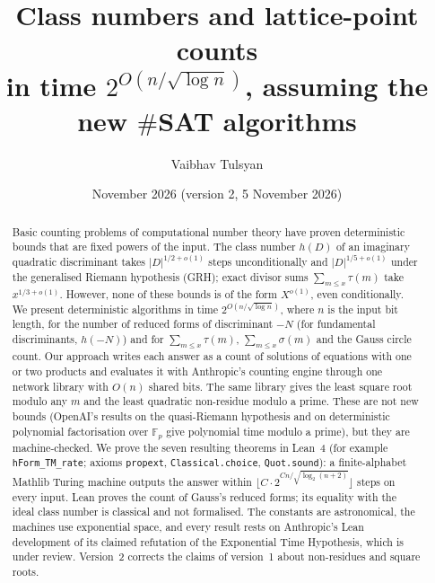 \documentclass[10pt]{amsart}
\theoremstyle{plain}
\theoremstyle{definition}
\theoremstyle{remark}
\numberwithin{equation}{section}
\begin{document}
\title[Class numbers and lattice-point counts in $2^{O(n/\sqrt{\log n})}$]{Class numbers and lattice-point counts\\ in time $2^{O(n/\sqrt{\log n})}$, assuming the new $\#$SAT algorithms}

\author{Vaibhav Tulsyan}

\date{November 2026 (version 2, 5 November 2026)}


\begin{abstract}
Basic counting problems of computational number theory have proven deterministic bounds that are fixed
powers of the input. The class number $h(D)$ of an imaginary quadratic discriminant takes $|D|^{1/2+o(1)}$
steps unconditionally and $|D|^{1/5+o(1)}$ under the generalised Riemann hypothesis (GRH); exact divisor
sums $\sum_{m\le x}\tau(m)$ take $x^{1/3+o(1)}$. However, none of these bounds is of the form $X^{o(1)}$,
even conditionally. We present deterministic algorithms in time $2^{O(n/\sqrt{\log n})}$, where $n$ is the
input bit length, for the number of reduced forms of discriminant $-N$ (for fundamental discriminants,
$h(-N)$) and for $\sum_{m\le x}\tau(m)$, $\sum_{m\le x}\sigma(m)$ and the Gauss circle count. Our approach
writes each answer as a count of solutions of equations with one or two products and evaluates it with
Anthropic's counting engine through one network library with $O(n)$ shared bits. The same library gives
the least square root modulo any $m$ and the least quadratic non-residue modulo a prime. These are not new
bounds (OpenAI's results on the quasi-Riemann hypothesis and on deterministic polynomial factorisation
over $\mathbb{F}_p$ give polynomial time modulo a prime), but they are machine-checked. We prove the seven
resulting theorems in Lean~4 (for example
\texttt{hForm\_TM\_rate}; axioms \texttt{propext}, \texttt{Classical.choice}, \texttt{Quot.sound}): a
finite-alphabet Mathlib Turing machine outputs the answer within
$\lfloor C\cdot2^{Cn/\sqrt{\log_2(n+2)}}\rfloor$ steps on every input. Lean proves the count of Gauss's
reduced forms; its equality with the ideal class number is classical and not formalised. The constants
are astronomical, the machines use exponential space, and every result rests on Anthropic's Lean development of its claimed refutation of the Exponential Time Hypothesis, which is under review.
Version~2 corrects the claims of version~1 about non-residues and square roots.
\end{abstract}
\end{document}

